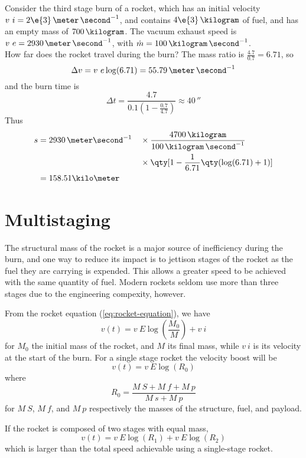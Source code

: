 \begin{example}
  Consider the third stage burn of a rocket, which has an initial
  velocity $v~i = 2 \e{3}\, \meter\, \second^{-1}$, and contains $4
  \e{3}\, \kilogram$ of fuel, and has an empty mass of $700\,
  \kilogram$. The vacuum exhaust speed is $v~e =
  2930\,\meter\,\second^{-1}$, with
  $\dot{m}=100\,\kilogram\,\second^{-1}$. \\ How far does the rocket
  travel during the burn?  The mass ratio is $\frac{4.7}{0.7} =
  6.71$, so \[ \Delta v = v~e \log(6.71) =
  55.79\,\meter\,\second^{-1} \] and the burn time is
\[ \Delta t = \frac{4.7}{0.1 (1 - \frac{0.7}{4.7} )} \approx 40\,\second \]
Thus \begin{align*} s &= 2930\,\meter\second^{-1} &&\times \frac{4700\,\kilogram}{100\,\kilogram\,\second^{-1}}\\ &&& \times \qty[1 - \frac{1}{6.71} \qty( \log(6.71) + 1 )] \\&= 158.51 \kilo\meter 
\end{align*}
\end{example}

\section{Multistaging}
\label{sec:multistaging}

The structural mass of the rocket is a major source of inefficiency
during the burn, and one way to reduce its impact is to jettison
stages of the rocket as the fuel they are carrying is expended. This
allows a greater speed to be achieved with the same quantity of
fuel. Modern rockets seldom use more than three stages due to the
engineering compexity, however.

From the rocket equation (\ref{eq:rocket-equation}), we have
\[ v(t) = v~E \log( \frac{M_0}{M} ) + v~i \] for $M_0$ the initial
mass of the rocket, and $M$ its final mass, while $v~i$ is its
velocity at the start of the burn. For a single stage rocket the
velocity boost will be
\[ v(t) = v~E \log(R_0) \]
where 
\[ R_0 = \frac{M~S + M~f + M~p}{M~s + M~p} \] for $M~S$, $M~f$, and
$M~p$ respectively the masses of the structure, fuel, and payload.

If the rocket is composed of two stages with equal mass,
\[ v(t) = v~E \log(R_1) + v~E \log(R_2) \] which is larger than the
total speed achievable using a single-stage rocket.

